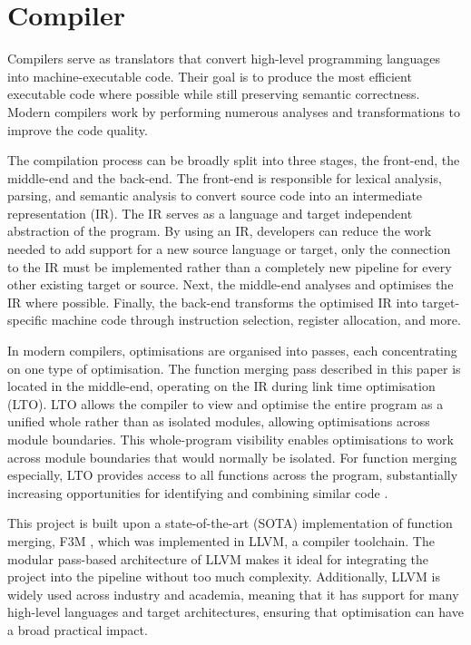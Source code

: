 \section{Compiler}
Compilers serve as translators that convert high-level programming languages into machine-executable code. Their goal is to produce the most efficient executable code where possible while still preserving semantic correctness. Modern compilers work by performing numerous analyses and transformations to improve the code quality.

The compilation process can be broadly split into three stages, the front-end, the middle-end and the back-end. The front-end is responsible for lexical analysis, parsing, and semantic analysis to convert source code into an intermediate representation (IR). The IR serves as a language and target independent abstraction of the program. By using an IR, developers can reduce the work needed to add support for a new source language or target, only the connection to the IR must be implemented rather than a completely new pipeline for every other existing target or source. Next, the middle-end analyses and optimises the IR where possible. Finally, the back-end transforms the optimised IR into target-specific machine code through instruction selection, register allocation, and more.

In modern compilers, optimisations are organised into passes, each concentrating on one type of optimisation. The function merging pass described in this paper is located in the middle-end, operating on the IR during link time optimisation (LTO). LTO allows the compiler to view and optimise the entire program as a unified whole rather than as isolated modules, allowing optimisations across module boundaries. This whole-program visibility enables optimisations to work across module boundaries that would normally be isolated. For function merging especially, LTO provides access to all functions across the program, substantially increasing opportunities for identifying and combining similar code \cite{FunctionMergingSequenceAlignment}. 

This project is built upon a state-of-the-art (SOTA) implementation of function merging, F3M \cite{F3M:FastFocusedFunctionMerging},  which was implemented in LLVM, a compiler toolchain. The modular pass-based architecture of LLVM makes it ideal for integrating the project into the pipeline without too much complexity. Additionally, LLVM is widely used across industry and academia, meaning that it has support for many high-level languages and target architectures, ensuring that optimisation can have a broad practical impact.


